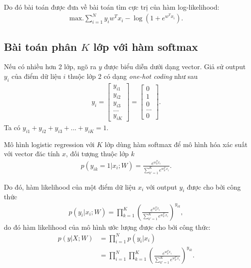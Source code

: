 \documentclass{book}
\begin{document}
Do đó bài toán được đưa về bài toán tìm cực trị của hàm log-likelihood:
\begin{align}
\mathrm{max.} \sum_{i=1}^N y_i w^T x_i - \log (1 + e^{w^T x_i}).
\end{align}


\subsection{Bài toán phân $K$ lớp với hàm softmax}

Nếu có nhiều hơn 2 lớp, ngõ ra $y$ được biểu diễn dưới dạng vector.
Giả sử output $y_i$ của điểm dữ liệu $i$ thuộc lớp 2 có dạng \emph{one-hot coding} như sau
\begin{align*}
y_i = \begin{bmatrix} y_{i1}\\ y_{i2} \\ y_{i3} \\ ... \\ y_{iK} \end{bmatrix} = \begin{bmatrix} 0 \\ 1 \\ 0 \\ ... \\ 0 \end{bmatrix}.
\end{align*}
Ta có $y_{i1} + y_{i2} + y_{i3} + ... + y_{iK} = 1$.

Mô hình logistic regression với $K$ lớp dùng hàm softmax để mô hình hóa xác suất với vector đăc tính $x$, đối tượng thuộc lớp $k$
\begin{align*}
p(y_{ik}=1 | x_i; W) = \frac{e^{w_k^T x_i}}{\sum_{k'=1}^K e^{w_{k'}^T x_i}}.
\end{align*}

Do đó, hàm likelihood của một điểm dữ liệu $x_i$ với output $y_i$ được cho bởi công thức
\begin{align}
p(y_i| x_i; W) = \prod_{k=1}^K \left( \frac{e^{w_k^T x_i}}{\sum_{k'=1}^K e^{w_{k'}^T x_i}}\right)^{y_{ik}},
\end{align}
do đó hàm likelihood của mô hình ước lượng được cho bởi công thức:
\begin{align}
p(y| X; W) 		&= \prod_{i=1}^N p(y_i| x_i)\\
&= \prod_{i=1}^N \prod_{k=1}^K \left( \frac{e^{w_k^T x_i}}{\sum_{k'=1}^K e^{w_{k'}^T x_i}}\right)^{y_{ik}}.
\label{eq:likelihood_Kclass}
\end{align}
\end{document}
